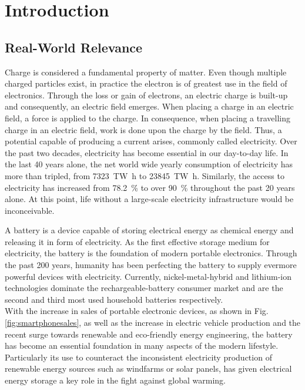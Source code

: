 \section{Introduction}
\subsection{Real-World Relevance}
Charge is considered a fundamental property of matter. Even though multiple charged particles exist, in practice the electron is of greatest use in the field of electronics. Through the loss or gain of electrons, an electric charge is built-up and consequently, an electric field emerges. When placing a charge in an electric field, a force is applied to the charge. In consequence, when placing a travelling charge in an electric field, work is done upon the charge by the field\cite{Kammer2019}. Thus, a potential capable of producing a current arises, commonly called electricity. Over the past two decades, electricity has become essential in our day-to-day life. In the last 40 years alone, the net world wide yearly consumption of electricity has more than tripled, from \SI{7323}{\tera\W\hour} to \SI{23845}{\tera\W\hour}\cite{Alves2022}. Similarly, the access to electricity has increased from \SI{78.2}{\percent} to over \SI{90}{\percent} throughout the past 20 years alone\cite{WorldBank2020}. At this point, life without a large-scale electricity infrastructure would be inconceivable.

A battery is a device capable of storing electrical energy as chemical energy and releasing it in form of electricity\cite{Bates2012}. As the first effective storage medium for electricity, the battery is the foundation of modern portable electronics. Through the past 200 years, humanity has been perfecting the battery to supply evermore powerful devices with electricity\cite{Schumm2022}. Currently, nickel-metal-hybrid and lithium-ion technologies dominate the rechargeable-battery consumer market and are the second and third most used household batteries respectively\cite{Schumm2022}.\\
With the increase in sales of portable electronic devices, as shown in Fig. \ref{fig:smartphonesales}, as well as the increase in electric vehicle production and the recent surge towards renewable and eco-friendly energy engineering, the battery has become an essential foundation in many aspects of the modern lifestyle\cite{Laricchia2022,Tarascon2010,Relations2022}.
Particularly its use to counteract the inconsistent electricity production of renewable energy sources such as windfarms or solar panels, has given electrical energy storage a key role in the fight against global warming.


